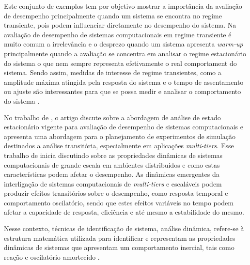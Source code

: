 Este conjunto de exemplos tem por objetivo mostrar a importância da avaliação de desempenho principalmente quando um sistema se encontra no regime transiente, pois podem influenciar diretamente no desempenho do sistema. Na avaliação de desempenho de sistemas computacionais em regime transiente é muito comum a irrelevância e o desprezo quando um sistema apresenta \textit{warm-up}  principalmente quando a avaliação se concentra em analisar o regime estacionário do sistema o que nem sempre representa efetivamente o real comportament do sistema. Sendo assim, medidas de interesse de regime transientes, como a amplitude máxima atingida pela resposta do sistema e o tempo de assentamento ou ajuste são interessantes para que se possa medir e analisar o comportamento do sistema \cite{Nobile2013}.

No trabalho de , o artigo discute sobre a abordagem de análise de estado estacionário vigente para avaliação de desempenho de sistemas computacionais e apresenta uma abordagem para o planejamento de experimentos de simulação destinados a análise transitória, especialmente em aplicações \textit{multi-tiers}.
Esse trabalho de  inicia discutindo sobre as propriedades dinâmicas de sistemas computacionais de grande escala em ambientes distribuídos e como estas características podem afetar o desempenho. As dinâmicas emergentes da interligação de sistemas computacionais de \textit{multi-tiers} e escaláveis podem produzir efeitos transitórios sobre o desempenho, como resposta temporal e comportamento oscilatório, sendo que estes efeitos variáveis no tempo podem afetar a capacidade de resposta, eficiência e até mesmo a estabilidade do mesmo. 

\begin{citacao}
	Nesse contexto, técnicas de identificação de sistema, análise dinâmica, refere-se à estrutura matemática utilizada para identificar e representam as propriedades dinâmicas de sistemas que apresentam um comportamento inercial, tais como reação e oscilatório amortecido \cite{Lourenco2015}. 
\end{citacao}

